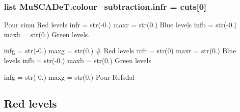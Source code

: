 \subsubsection[{infr}]{\setlength{\rightskip}{0pt plus 5cm}list Mu\+S\+C\+A\+De\+T.\+colour\+\_\+subtraction.\+infr = cuts\mbox{[}0\mbox{]}}\label{namespace_mu_s_c_a_de_t_1_1colour__subtraction_afb87ac62289e56dd4a37691397e81eaa}


Pour simu Red levels infr = str(-\/0.) maxr = str(0.) Blue levels infb = str(-\/0.) maxb = str(0.) Green levels. 

infg = str(-\/0.) maxg = str(0.) \# Red levels infr = str(0) maxr = str(0.) Blue levels infb = str(-\/0.) maxb = str(0.) Green levels

infg = str(-\/0.) maxg = str(0.) Pour Refsdal \subsection*{Red levels}
